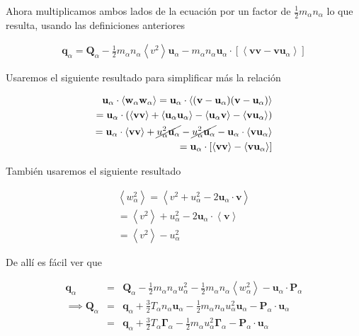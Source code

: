   Ahora multiplicamos ambos lados de la ecuaci\'on por un factor de $\frac{1}{2}m_\alpha n_\alpha$ lo que resulta, usando las definiciones anteriores 
  
  \begin{eqnarray*}
    \textbf{q}_\alpha = \textbf{Q}_\alpha - \frac{1}{2}m_\alpha n_\alpha\left<v^2\right>\textbf{u}_\alpha - m_\alpha n_\alpha\textbf{u}_\alpha\cdot[\left<\textbf{vv} - \textbf{vu}_\alpha\right>]
  \end{eqnarray*}


  \begin{shaded}
  
    Usaremos el siguiente resultado para simplificar m\'as la relaci\'on
    
    \begin{eqnarray*}
    \textbf{u}_\alpha\cdot\left<\textbf{w}_\alpha\textbf{w}_\alpha\right> = \textbf{u}_\alpha\cdot\left<(\textbf{v} - \textbf{u}_\alpha)(\textbf{v} - \textbf{u}_\alpha)\right>\\
  = \textbf{u}_\alpha\cdot(\left<\textbf{vv}\right> + \left<\textbf{u}_\alpha\textbf{u}_\alpha\right> - \left<\textbf{u}_\alpha\textbf{v}\right> - \left<\textbf{vu}_\alpha\right>) \\
      = \textbf{u}_\alpha\cdot\left<\textbf{vv}\right> + \cancel{u_\alpha^2\textbf{u}_\alpha} - \cancel{u_\alpha^2\textbf{u}_\alpha} - \textbf{u}_\alpha\cdot\left<\textbf{vu}_\alpha\right>\\
      = \textbf{u}_\alpha\cdot[\left<\textbf{vv}\right> - \left<\textbf{vu}_\alpha\right>]
    \end{eqnarray*}

    Tambi\'en usaremos el siguiente resultado

    \begin{eqnarray*}
      \left<w^2_\alpha\right> = \left<v^2 + u_\alpha^2 - 2\textbf{u}_\alpha\cdot\textbf{v}\right>\\
      = \left<v^2\right> + u_\alpha^2 - 2\textbf{u}_\alpha\cdot\left<\textbf{v}\right>\\
      = \left<v^2\right> - u_\alpha^2
    \end{eqnarray*}
  \end{shaded}

  De all\'i es f\'acil ver que 

  \begin{eqnarray}
    \textbf{q}_\alpha &=& \textbf{Q}_\alpha -\frac{1}{2}m_\alpha n_\alpha u_\alpha^2 - \frac{1}{2}m_\alpha n_\alpha\left<w_\alpha^2\right> - \textbf{u}_\alpha\cdot\textbf{P}_\alpha\nonumber\\
  \implies \textbf{Q}_\alpha &=& \textbf{q}_\alpha + \frac{3}{2}T_\alpha n_\alpha\textbf{u}_\alpha - \frac{1}{2}m_\alpha n_\alpha u_\alpha^2\textbf{u}_\alpha - \textbf{P}_\alpha\cdot\textbf{u}_\alpha\nonumber \\
                        &=& \textbf{q}_\alpha + \frac{3}{2}T_\alpha\pmb{\Gamma}_\alpha - \frac{1}{2}m_\alpha u_\alpha^2\pmb{\Gamma}_\alpha - \textbf{P}_\alpha\cdot\textbf{u}_\alpha
  \end{eqnarray}

